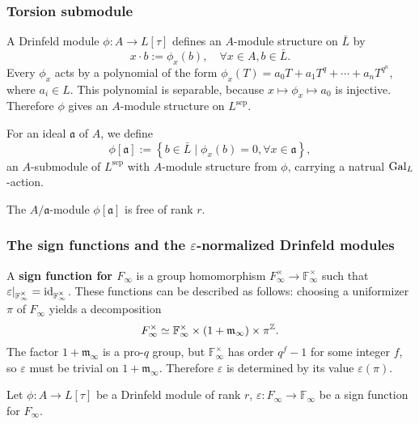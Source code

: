 \documentclass{article}
\newcommand{\F}{\mathbb{F}}
\newcommand{\perf}{\mathrm{perf}}
\newcommand{\sep}{\mathrm{sep}}
\newcommand{\m}{\mathfrak{m}}
\begin{document}
\subsubsection{Torsion submodule}
A Drinfeld module $\phi : A\to L[\tau]$
defines an $A$-module structure on $\bar L$ by\[x\cdot b := \phi_x(b),\quad\forall x\in A, b\in\bar L.\]
Every $\phi_x$ acts by a polynomial of the form $\phi_x(T) = a_0T + a_1T^q + \cdots + a_nT^{q^n}$, where $a_i\in L$.
This polynomial is separable, because $x\mapsto \phi_x\mapsto a_0$ is injective.
Therefore $\phi$ gives an $A$-module structure on $L^\sep$.

For an ideal $\mathfrak{a}$ of $A$,
we define \[\phi[\mathfrak{a}] :=
\left\{ b\in\bar L\mid \phi_x(b) = 0,\forall x\in\mathfrak{a} \right\},\]
an $A$-submodule of $L^\sep$ with $A$-module structure from $\phi$,
carrying a natrual $\operatorname{Gal}_L$-action.

\begin{lemma}\label{torsion submodule of an ideal}
    The $A/\mathfrak{a}$-module $\phi[\mathfrak{a}]$ is free of rank $r$.
\end{lemma}


\subsubsection{The sign functions and the \texorpdfstring{$\varepsilon$}{epsilon}-normalized Drinfeld modules}
A \textbf{sign function for $F_\infty$} is a
group homomorphism $F_\infty^\times\to\F_\infty^\times$ such that $\varepsilon|_{\F_\infty^\times} = \Id_{\F_\infty^\times}$.
These functions
can be described as follows: choosing a uniformizer $\pi$ of $F_\infty$
yields a decomposition \[F_\infty^\times\simeq \F_\infty^\times\times (1 + \m_\infty)\times \pi^{\Z}.\]
The factor $1 + \m_\infty$ is a pro-$q$ group,
but $\F_\infty^\times$ has order $q^f - 1$ for some integer $f$,
so $\varepsilon$ must be trivial on $1 + \m_\infty$.
Therefore $\varepsilon$ is
determined by its value $\varepsilon(\pi)$.



Let $\phi : A\to L[\tau]$ be a Drinfeld module of rank $r$, 
$\varepsilon : F_\infty\to\F_\infty$ be a sign function for $F_\infty$.
\end{document}

